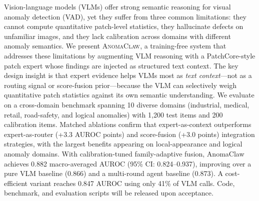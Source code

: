 Vision-language models (VLMs) offer strong semantic reasoning for visual anomaly detection (VAD), yet they suffer from three common limitations: they cannot compute quantitative patch-level statistics, they hallucinate defects on unfamiliar images, and they lack calibration across domains with different anomaly semantics.
We present \textsc{AnomaClaw}, a training-free system that addresses these limitations by augmenting VLM reasoning with a PatchCore-style patch expert whose findings are injected as structured text context.
The key design insight is that expert evidence helps VLMs most as \emph{text context}---not as a routing signal or score-fusion prior---because the VLM can selectively weigh quantitative patch statistics against its own semantic understanding.
We evaluate on a cross-domain benchmark spanning 10 diverse domains (industrial, medical, retail, road-safety, and logical anomalies) with 1{,}200 test items and 200 calibration items.
Matched ablations confirm that expert-as-context outperforms expert-as-router (+3.3 AUROC points) and score-fusion (+3.0 points) integration strategies, with the largest benefits appearing on local-appearance and logical anomaly domains.
With calibration-tuned family-adaptive fusion, AnomaClaw achieves 0.882 macro-averaged AUROC (95\% CI: 0.824--0.937), improving over a pure VLM baseline (0.866) and a multi-round agent baseline (0.873).
A cost-efficient variant reaches 0.847 AUROC using only 41\% of VLM calls.
Code, benchmark, and evaluation scripts will be released upon acceptance.
